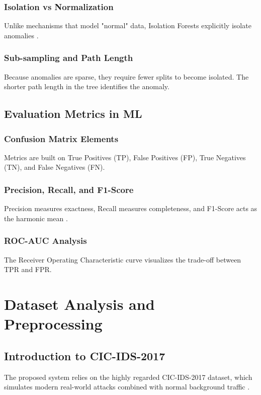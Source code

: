 \documentclass[12pt, a4paper]{report}
\begin{document}
\subsection{Isolation vs Normalization}
Unlike mechanisms that model "normal" data, Isolation Forests explicitly isolate anomalies \cite{ref2}. 
\subsection{Sub-sampling and Path Length}
Because anomalies are sparse, they require fewer splits to become isolated. The shorter path length in the tree identifies the anomaly.

\section{Evaluation Metrics in ML}
\subsection{Confusion Matrix Elements}
Metrics are built on True Positives (TP), False Positives (FP), True Negatives (TN), and False Negatives (FN).
\subsection{Precision, Recall, and F1-Score}
Precision measures exactness, Recall measures completeness, and F1-Score acts as the harmonic mean \cite{ref3}.
\subsection{ROC-AUC Analysis}
The Receiver Operating Characteristic curve visualizes the trade-off between TPR and FPR.

\chapter{Dataset Analysis and Preprocessing}
\section{Introduction to CIC-IDS-2017}
The proposed system relies on the highly regarded CIC-IDS-2017 dataset, which simulates modern real-world attacks combined with normal background traffic \cite{ref4}.
\end{document}
